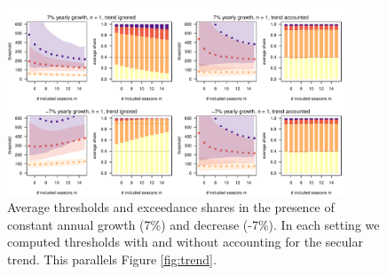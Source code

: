 \documentclass[12pt]{article}
\begin{document}


\begin{figure}[h!]
\begin{center}
\includegraphics[width = 0.9\textwidth]{figure/plot_trend7_fr_small.pdf}
\end{center}
\caption{Average thresholds and exceedance shares in the presence of constant annual growth (7\%) and decrease (-7\%). In each setting we computed thresholds with and without accounting for the secular trend. This parallels Figure \ref{fig:trend}.}
\label{fig:trend7}
\end{figure}

\newpage
\end{document}

